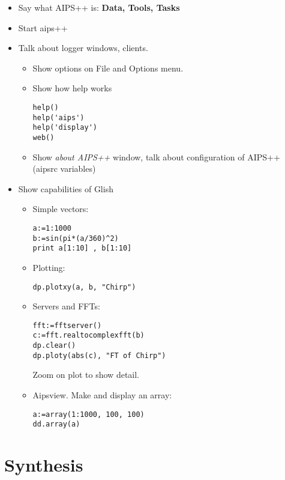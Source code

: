 \begin{itemize}
\item Say what AIPS++ is: {\bf Data, Tools, Tasks}
\item Start aips++
\item Talk about logger windows, clients. 
\begin{itemize}
\item Show options on File and Options menu. 
\item Show how help works
\begin{verbatim}
help()
help('aips')
help('display')
web()
\end{verbatim}
\item Show {\em about AIPS++} window, talk about configuration of
AIPS++ (aipsrc variables)
\end{itemize}
\item Show capabilities of Glish
\begin{itemize}
\item Simple vectors: 
\begin{verbatim}
a:=1:1000
b:=sin(pi*(a/360)^2)
print a[1:10] , b[1:10]
\end{verbatim}
\item Plotting: 
\begin{verbatim}
dp.plotxy(a, b, "Chirp")
\end{verbatim}
\item Servers and FFTs:
\begin{verbatim}
fft:=fftserver()
c:=fft.realtocomplexfft(b)
dp.clear()
dp.ploty(abs(c), "FT of Chirp")
\end{verbatim}
Zoom on plot to show detail.
\item Aipsview. Make and display an array:
\begin{verbatim}
a:=array(1:1000, 100, 100)
dd.array(a)
\end{verbatim}
\end{itemize}
\end{itemize}

\section{Synthesis}

